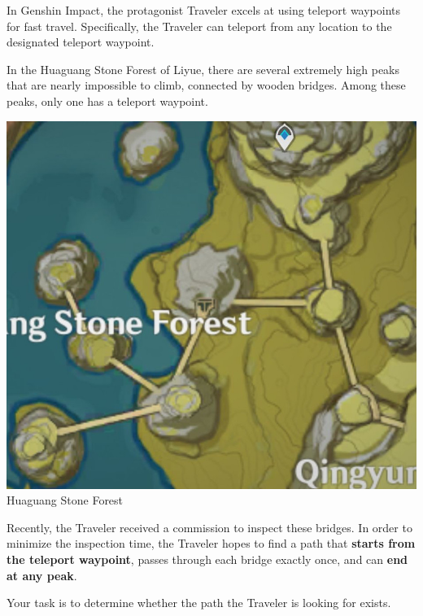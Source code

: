 In Genshin Impact, the protagonist Traveler excels at using teleport waypoints for fast travel. Specifically, the Traveler can teleport from any location to the designated teleport waypoint.

In the Huaguang Stone Forest of Liyue, there are several extremely high peaks that are nearly impossible to climb, connected by wooden bridges. Among these peaks, only one has a teleport waypoint.

\begin{center}
  \includegraphics[scale=0.8]{path.jpg} \\
  \small{Huaguang Stone Forest}
\end{center}

Recently, the Traveler received a commission to inspect these bridges. In order to minimize the inspection time, the Traveler hopes to find a path that \textbf{starts from the teleport waypoint}, passes through each bridge exactly once, and can \textbf{end at any peak}.

Your task is to determine whether the path the Traveler is looking for exists.